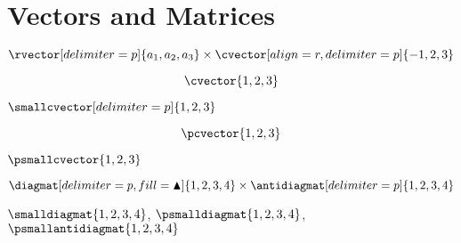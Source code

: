\documentclass[parskip=half]{scrartcl}
\begin{document}
\section{Vectors and Matrices}

\begin{Example}[gobble=2]
  \[
    \rvector[delimiter=p]{a_{1},a_{2},a_{3}}
    \times \cvector[align=r,delimiter=p]{-1,2,3}
  \]
\end{Example}

\fulllinerule

\begin{SideBySideExample}[xrightmargin=.5\textwidth,gobble=2]
  \[
    \cvector{1,2,3}
  \]
\end{SideBySideExample}

\fulllinerule

\begin{SideBySideExample}[xrightmargin=.45\textwidth]
\(\smallcvector[delimiter=p]{1,2,3}\)
\end{SideBySideExample}

\fulllinerule

\begin{SideBySideExample}[gobble=2,xrightmargin=.5\textwidth]
  \[
    \pcvector{1,2,3}
  \]

  \(\psmallcvector{1,2,3}\)
\end{SideBySideExample}

\fulllinerule

\begin{Example}[gobble=2]
  \[
    \diagmat[delimiter=p,fill=\blacktriangle]{1,2,3,4} \times
    \antidiagmat[delimiter=p]{1,2,3,4}
  \]
\end{Example}

\fulllinerule

\begin{Example}[gobble=2]
  \(\smalldiagmat{1,2,3,4}\),
  \(\psmalldiagmat{1,2,3,4}\),
  \(\psmallantidiagmat{1,2,3,4}\)
\end{Example}
\end{document}
